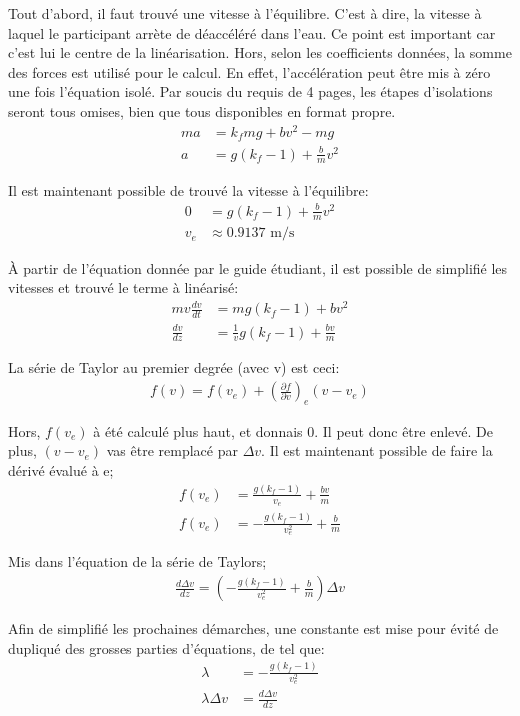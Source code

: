 Tout d'abord, il faut trouvé une vitesse à l'équilibre. C'est à dire, la
vitesse à laquel le participant arrète de déaccéléré dans l'eau.
Ce point est important car c'est lui le centre de la linéarisation.
Hors, selon les coefficients données, la somme des forces est utilisé pour le
calcul. En effet, l'accélération peut être mis à zéro une fois l'équation isolé.
Par soucis du requis de 4 pages, les étapes d'isolations seront tous omises,
bien que tous disponibles en format propre.
\begin{align}
ma&=k_fmg+bv^2-mg \\
a&=g(k_f-1)+\frac{b}{m}v^2
\end{align}

Il est maintenant possible de trouvé la vitesse à l'équilibre:
\begin{align}
0&=g(k_f-1)+\frac{b}{m}v^2 \\
v_e&\approx0.9137\text{ m/s}
\end{align}

À partir de l'équation donnée par le guide étudiant, il est possible de
simplifié les vitesses et trouvé le terme à linéarisé:
\begin{align}
mv\frac{dv}{dt}&=mg(k_f-1)+bv^2 \\
\frac{dv}{dz}&=\frac{1}{v}g(k_f-1)+\frac{bv}{m}
\end{align}

La série de Taylor au premier degrée (avec v) est ceci:
\begin{align}
f(v)=f(v_e)+(\frac{\partial f}{\partial v})_e(v-v_e)
\end{align}

Hors, $f(v_e)$ à été calculé plus haut, et donnais $0$. Il peut donc être
enlevé. De plus, $(v-v_e)$ vas être remplacé par $\Delta v$. Il est
maintenant possible de faire la dérivé évalué à e;
\begin{align}
f(v_e)&=\frac{g(k_f-1)}{v_e}+\frac{bv}{m} \\
f(v_e)&=-\frac{g(k_f-1)}{v_e^2}+\frac{b}{m}
\end{align}

Mis dans l'équation de la série de Taylors;
\begin{align}
\frac{d\Delta v}{dz}=(-\frac{g(k_f-1)}{v_e^2}+\frac{b}{m})\Delta v
\end{align}

Afin de simplifié les prochaines démarches, une constante est mise pour évité
de dupliqué des grosses parties d'équations, de tel que:
\begin{align}
\lambda &= -\frac{g(k_f-1)}{v_e^2} \\
\lambda\Delta v&=\frac{d\Delta v}{dz}
\end{align}

